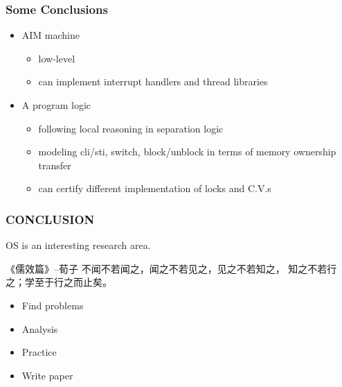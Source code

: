 \begin{frame}[plain]	
	\frametitle{Some Conclusions}
	
	\begin{itemize}\Large
		\item AIM machine
		\begin{itemize}\large
			\item low-level
			\item can implement interrupt handlers and thread libraries
			
		\end{itemize}
	
		\item A program logic
		\begin{itemize}\large
			\item following local reasoning in separation logic
			\item modeling cli/sti, switch, block/unblock in terms of
			memory ownership transfer
			\item can certify different implementation of locks and C.V.s
			
		\end{itemize}
	\end{itemize}
	
	
\end{frame}

\begin{frame}[plain]	
	\frametitle{CONCLUSION}
	
	\LARGE
	OS is an interesting research area.
	\begin{block}{《儒效篇》--荀子}
	不闻不若闻之，闻之不若见之，见之不若知之，
	知之不若行之；学至于行之而止矣。 
\end{block} 	
	\begin{itemize}\Large
			\item Find problems
			\item Analysis
			\item Practice
			\item Write paper
	\end{itemize}
     
	
\end{frame}
